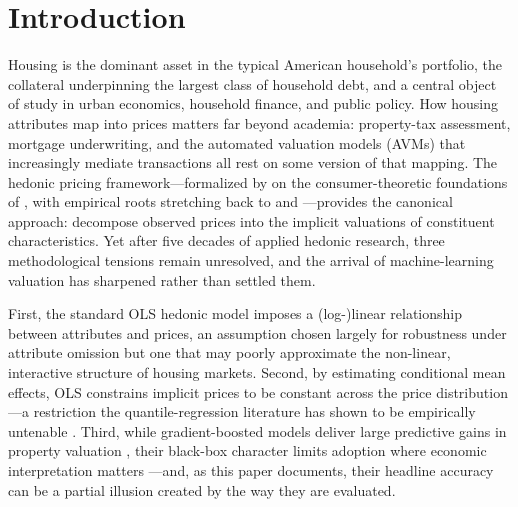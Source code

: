 %
\section{Introduction}
\label{sec:introduction}

Housing is the dominant asset in the typical American household's portfolio, the
collateral underpinning the largest class of household debt, and a central object
of study in urban economics, household finance, and public policy. How housing
attributes map into prices matters far beyond academia: property-tax assessment,
mortgage underwriting, and the automated valuation models (AVMs) that increasingly
mediate transactions all rest on some version of that mapping. The hedonic pricing
framework---formalized by \citet{rosen1974hedonic} on the consumer-theoretic
foundations of \citet{lancaster1966new}, with empirical roots stretching back to
\citet{waugh1928quality} and \citet{court1939hedonic}---provides the canonical
approach: decompose observed prices into the implicit valuations of constituent
characteristics. Yet after five decades of applied hedonic research, three
methodological tensions remain unresolved, and the arrival of machine-learning
valuation has sharpened rather than settled them.

First, the standard OLS hedonic model imposes a (log-)linear relationship between
attributes and prices, an assumption chosen largely for robustness under attribute
omission \citep{cropper1988choice} but one that may poorly approximate the
non-linear, interactive structure of housing markets. Second, by estimating
conditional mean effects, OLS constrains implicit prices to be constant across the
price distribution---a restriction the quantile-regression literature has shown to
be empirically untenable \citep{zietz2008determinants, mcmillen2008changes,
liao2012hedonic}. Third, while gradient-boosted models deliver large predictive
gains in property valuation \citep{bourassa2010predicting, kok2017big}, their
black-box character limits adoption where economic interpretation matters
\citep{mullainathan2017machine, athey2019machine}---and, as this paper documents,
their headline accuracy can be a partial illusion created by the way they are
evaluated.

